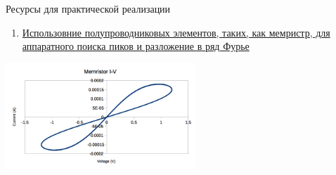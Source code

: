 \documentclass[xcolor=table]{beamer}
\begin{document}
\begin{frame}{Ресурсы для практической реализации}
\begin{enumerate}
    \item \href{https://www.intechopen.com/chapters/53607}{Использовние полупроводниковых элементов, таких, как
    мемристр, для аппаратного поиска пиков и разложение в ряд Фурье}
\end{enumerate}
\centering
\includegraphics[height=4cm]{MemristorI-V.png}
\end{frame}
\end{document}
